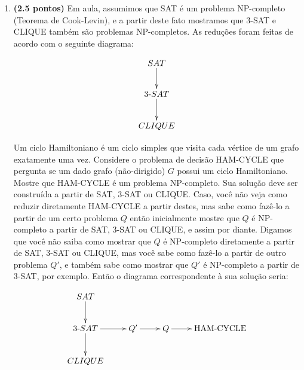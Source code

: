 \documentclass[12pt]{article}
\begin{document}
\begin{enumerate}
{    %
    
    
    
  }
  
\newpage
\item {\bf (2.5 pontos)} Em aula, assumimos que SAT é um problema
  NP-completo (Teorema de Cook-Levin), e a partir deste fato mostramos
  que 3-SAT e CLIQUE também são problemas NP-completos. As reduções
  foram feitas de acordo com o seguinte diagrama:

  $$\xymatrix{
    SAT \ar[d] \\
    3\mbox{-}SAT \ar[d] \\
    CLIQUE 
  }$$
  
  Um ciclo Hamiltoniano é um ciclo simples que visita cada vértice de
  um grafo exatamente uma vez. Considere o problema de decisão
  HAM-CYCLE que pergunta se um dado grafo (não-dirigido) $G$ possui um
  ciclo Hamiltoniano. Mostre que HAM-CYCLE é um problema
  NP-completo. Sua solução deve ser construída a partir de SAT, 3-SAT
  ou CLIQUE. Caso, você não veja como reduzir diretamente HAM-CYCLE a
  partir destes, mas sabe como fazê-lo a partir de um certo problema
  $Q$ então inicialmente mostre que $Q$ é NP-completo a partir de SAT,
  3-SAT ou CLIQUE, e assim por diante. Digamos que você não saiba como
  mostrar que $Q$ é NP-completo diretamente a partir de SAT, 3-SAT ou
  CLIQUE, mas você sabe como fazê-lo a partir de outro problema $Q'$,
  e também sabe como mostrar que $Q'$ é NP-completo a partir de 3-SAT,
  por exemplo. Então o diagrama correspondente à sua solução seria:

$$\xymatrix{
  SAT \ar[d] & & & \\
  3\mbox{-}SAT \ar[d]\ar[r] & Q' \ar[r] & Q \ar[r] & \mbox{HAM-CYCLE}  \\
  CLIQUE & & & 
}$$


\end{enumerate}
\end{document}
